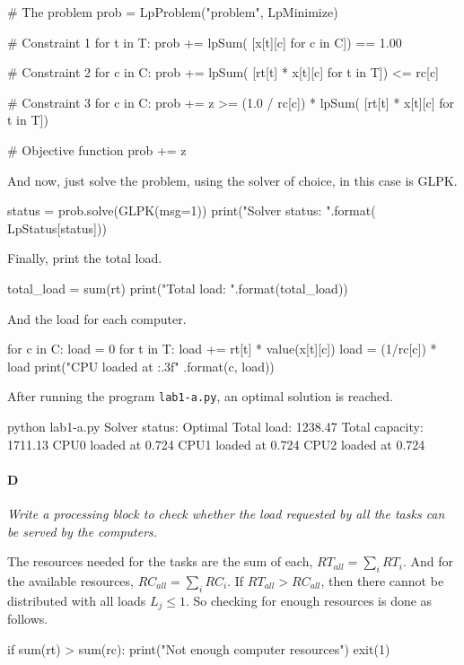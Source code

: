\documentclass[11pt,a4paper,twocolumn]{article}
\begin{document}
\begin{pycode}
# The problem
prob = LpProblem("problem", LpMinimize)

# Constraint 1
for t in T:
	prob +=
		lpSum(
			[x[t][c] for c in C]) == 1.00

# Constraint 2
for c in C:
	prob +=
		lpSum(
			[rt[t] * x[t][c] for t in T]) <= rc[c]

# Constraint 3
for c in C:
	prob +=
		z >= (1.0 / rc[c]) * lpSum(
			[rt[t] * x[t][c] for t in T])

# Objective function
prob += z
\end{pycode}
%
And now, just solve the problem, using the solver of choice, in this case is 
GLPK.
\begin{pycode}
status = prob.solve(GLPK(msg=1))
print("Solver status: {}".format(
	LpStatus[status]))
\end{pycode}
%
Finally, print the total load.
%
\begin{pycode}
total_load = sum(rt)
print("Total load: {}".format(total_load))
\end{pycode}
And the load for each computer.
\begin{pycode}
for c in C:
	load = 0
	for t in T:
		load +=
			rt[t] * value(x[t][c])
	load = (1/rc[c]) * load
	print("CPU{} loaded at {:.3f}"
		.format(c, load))
\end{pycode}
After running the program \texttt{lab1-a.py}, an optimal solution is reached.
\begin{pycode}
python lab1-a.py
Solver status: Optimal
Total load: 1238.47
Total capacity: 1711.13
CPU0 loaded at 0.724
CPU1 loaded at 0.724
CPU2 loaded at 0.724
\end{pycode}

\paragraph*{D}
\textsl{Write a processing block to check whether the load requested by all the 
tasks can be served by the computers.}

The resources needed for the tasks are the sum of each, $RT_{all} = \sum_i 
RT_i$.  And for the available resources, $RC_{all} = \sum_i RC_i$. If $RT_{all} 
> RC_{all}$, then there cannot be distributed with all loads $L_j \le 1$. So 
checking for enough resources is done as follows.
\begin{pycode}
if sum(rt) > sum(rc):
	print("Not enough computer resources")
	exit(1)
\end{pycode}
\end{document}

